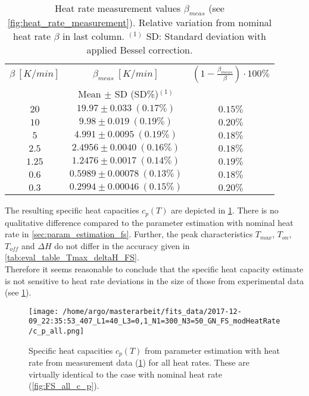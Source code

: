 \documentclass{scrartcl}[12pt, halfparskip]
\numberwithin{equation}{section}
\numberwithin{figure}{section}
\numberwithin{table}{section}
\begin{document}
\begin{table}[H]
	\centering
	\caption{Heat rate measurement values $\beta_{meas}$ (see \cref{fig:heat_rate_measurement}). Relative variation from nominal heat rate $\beta$ in last column. $^{(1)}$ SD: Standard deviation with applied Bessel correction.}
	\begin{tabular}{| c | c | c |} \hline 
		$\beta \ [K/min]$ & $\beta_{meas} \ [K/min]$ & $\left(1 - \frac{\beta_{meas}}{\beta}\right) \cdot 100\%$  \\ 
		& Mean $\pm$ SD (SD\%)$^{(1)}$ & \\ \hline
		$20$ & $19.97 \pm 0.033 \ (0.17\%)$ & $0.15\%$ \\
		$10$ & $9.98 \pm 0.019 \ (0.19\%)$ & $0.20\%$ \\
		$5$ & $4.991 \pm 0.0095 \ (0.19\%)$ & $0.18\%$ \\
		$2.5$ & $2.4956 \pm 0.0040 \ (0.16\%)$ & $0.18\%$ \\
		$1.25$ & $1.2476 \pm 0.0017 \ (0.14\%)$ & $0.19\%$ \\
		$0.6$ & $0.5989 \pm 0.00078 \ (0.13\%)$ & $0.18\%$ \\
		$0.3$ & $0.2994 \pm 0.00046 \ (0.15\%)$ & $0.20\%$ \\ \hline
	\end{tabular}
	\label{tab:mod_heat_rate}
\end{table}

The resulting specific heat capacities $c_p(T)$ are depicted in \cref{fig:FS_all_c_p_modHeatRate}. There is no qualitative difference compared to the parameter estimation with nominal heat rate in \cref{sec:param_estimation_fs}. Further, the peak characteristics $T_{max}$, $T_{on}$, $T_{off}$ and $\Delta H$ do not differ in the accuracy given in \cref{tab:eval_table_Tmax_deltaH_FS}. \\
Therefore it seems reasonable to conclude that the specific heat capacity estimate is not sensitive to heat rate deviations in the size of those from experimental data (see \cref{tab:mod_heat_rate}).

\begin{figure}[H]
	\centering
	\texttt{[image: /home/argo/masterarbeit/fits\_data/2017-12-09\_22:35:53\_407\_L1=40\_L3=0,1\_N1=300\_N3=50\_GN\_FS\_modHeatRate/c\_p\_all.png]}
	\caption{Specific heat capacities $c_p(T)$ from parameter estimation with heat rate from measurement data (\cref{tab:mod_heat_rate}) for all heat rates. These are virtually identical to the case with nominal heat rate (\cref{fig:FS_all_c_p}).}
	\label{fig:FS_all_c_p_modHeatRate}
\end{figure}
\end{document}
